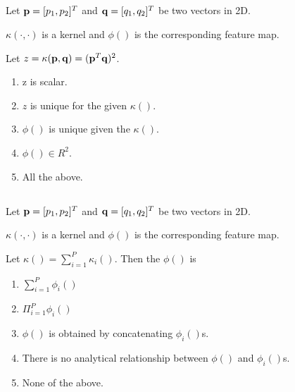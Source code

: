 \begin{frame}
\section{}
Let ${\bf p} = [p_1, p_2]^T$ and ${\bf q} = [q_1, q_2]^T$ be two vectors in 2D.

$\kappa(\cdot,\cdot)$ is a kernel and $\phi()$ is the corresponding feature map.

Let $z = \kappa({\bf p}, {\bf q}) = ({\bf p}^T{\bf q})^2$.
\begin{enumerate}[label=(\Alph*)]
\item z is scalar.    %
\item $z$ is unique for the given $\kappa()$.   %
\item $\phi()$ is unique given the $\kappa()$.
\item $\phi() \in R^2$.
\item All the above.  %
\end{enumerate}
\end{frame}

\begin{frame}
\section{}
Let ${\bf p} = [p_1, p_2]^T$ and ${\bf q} = [q_1, q_2]^T$ be two vectors in 2D.

$\kappa(\cdot,\cdot)$ is a kernel and $\phi()$ is the corresponding feature map.

Let $\kappa() = \sum_{i=1}^P \kappa_i()$. Then the $\phi()$ is


\begin{enumerate}[label=(\Alph*)]
\item $\sum_{i=1}^P \phi_i()$
\item $\Pi_{i=1}^P \phi_i()$
\item $\phi()$ is obtained by concatenating $\phi_i()$s.    %
\item There is no analytical relationship between $\phi()$ and $\phi_i()$s.
\item None of the above.  %
\end{enumerate}
\end{frame}

